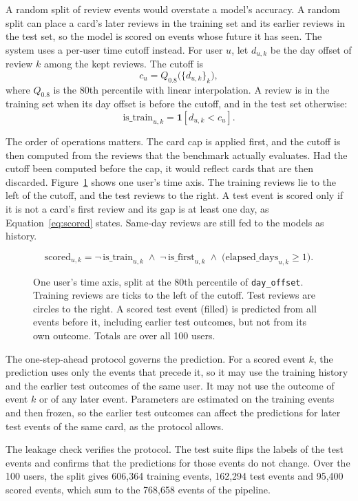 A random split of review events would overstate a model's accuracy. A random split can place a card's later reviews in
the training set and its earlier reviews in the test set, so the model is scored on events whose future it has seen.
The system uses a per-user time cutoff instead. For user $u$, let $d_{u,k}$ be the day offset of review $k$ among the
kept reviews. The cutoff is
\begin{equation}
  c_u = Q_{0.8}\bigl(\{d_{u,k}\}_k\bigr),
  \label{eq:cutoff}
\end{equation}
where $Q_{0.8}$ is the 80th percentile with linear interpolation. A review is in the training set when its day offset is
before the cutoff, and in the test set otherwise:
\begin{equation}
  \mathrm{is\_train}_{u,k} = \mathbf{1}[d_{u,k} < c_u].
  \label{eq:train}
\end{equation}

The order of operations matters. The card cap is applied first, and the cutoff is then computed from the reviews that
the benchmark actually evaluates. Had the cutoff been computed before the cap, it would reflect cards that are then
discarded. Figure~\ref{fig:tk_split_timeline} shows one user's time axis. The training reviews lie to the left of the
cutoff, and the test reviews to the right. A test event is scored only if it is not a card's first review and its
gap is at least one day, as Equation~\eqref{eq:scored} states. Same-day reviews are still fed to the models as history.

\begin{equation}
  \mathrm{scored}_{u,k} = \neg\,\mathrm{is\_train}_{u,k} \;\wedge\; \neg\,\mathrm{is\_first}_{u,k} \;\wedge\;
  \bigl(\mathrm{elapsed\_days}_{u,k} \ge 1\bigr).
  \label{eq:scored}
\end{equation}

\begin{figure}[htbp]
  \centering
  
  \caption{One user's time axis, split at the 80th percentile of \texttt{day\_offset}. Training reviews are
    ticks to the left of the cutoff. Test reviews are circles to the right. A scored test event (filled) is predicted
    from all events before it, including earlier test outcomes, but not from its own outcome. Totals are over all 100
    users.}
  \label{fig:tk_split_timeline}
\end{figure}

The one-step-ahead protocol governs the prediction. For a scored event $k$, the prediction uses only the events that
precede it, so it may use the training history and the earlier test outcomes of the same user. It may not use the
outcome of event $k$ or of any later event. Parameters are estimated on the training events and then frozen, so the
earlier test outcomes can affect the predictions for later test events of the same card, as the protocol allows.

The leakage check verifies the protocol. The test suite flips the labels of the test events and confirms that the
predictions for those events do not change. Over the 100 users, the split gives 606,364 training events, 162,294 test
events and 95,400 scored events, which sum to the 768,658 events of the pipeline.
